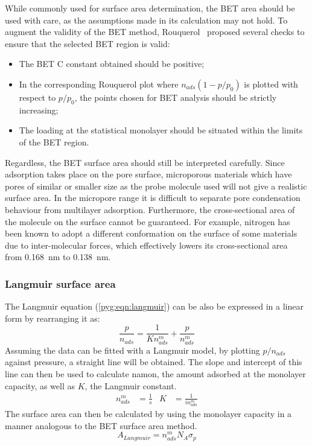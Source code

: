 While commonly used for surface area determination, the \gls{BET} area
should be used with care, as the assumptions made in
its calculation may not hold. To augment the validity of the \gls{BET}
method, Rouquerol~\cite{rouquerolAdsorptionPowdersPorous2013} proposed
several checks to ensure that the selected \gls{BET} region is valid:

\begin{itemize}

	\item The \gls{BET} \gls{C} constant obtained should be positive;
	\item In the corresponding Rouquerol plot where \(n_{ads}(1-p/p_0)\)
	      is plotted with respect to \(p/p_0\), the points chosen for \gls{BET}
	      analysis should be strictly increasing;
	\item The loading at the statistical monolayer should be
	      situated within the limits of the \gls{BET} region.

\end{itemize}

Regardless, the \gls{BET} surface area should still be interpreted carefully.
Since adsorption takes place on the pore surface, microporous materials
which have pores of similar or smaller size as the probe molecule used
will not give a realistic surface area. In the micropore range
it is difficult to separate pore condensation behaviour from
multilayer adsorption. Furthermore, the cross-sectional
area of the molecule on the surface cannot be guaranteed. For example,
nitrogen has been known to adopt a different conformation on the surface
of some materials due to inter-molecular forces, which effectively
lowers its cross-sectional area~\cite{rouquerolAdsorptionPowdersPorous2013}
from \SI{0.168}{\nano\metre} to \SI{0.138}{\nano\metre}.

\subsubsection{Langmuir surface area}\label{pyg:charac:langmuirarea}

The Langmuir equation (\autoref{pyg:eqn:langmuir}) can be also
be expressed in a linear form by rearranging it as:
%
\begin{equation}
	\frac{p}{n_{ads}} = \frac{1}{K n_{ads}^m} + \frac{p}{n_{ads}^m}
\end{equation}
%
Assuming the data can be fitted with a Langmuir model, by plotting
\({p}/{n_{ads}}\) against pressure, a straight line will be obtained.
The slope and intercept of this line can then be used to calculate
\gls{namon}, the amount adsorbed at the monolayer capacity, as well
as \(K\), the Langmuir constant.
%
\begin{align}
	n_{ads}^m & = \frac{1}{s} & K & = \frac{1}{i n_{ads}^m}
\end{align}
%
The surface area can then be calculated by using the monolayer
capacity in a manner analogous to the \gls{BET} surface area method.
%
\begin{equation}
	A_{Langmuir} = n_{ads}^m N_A \sigma_p
\end{equation}

